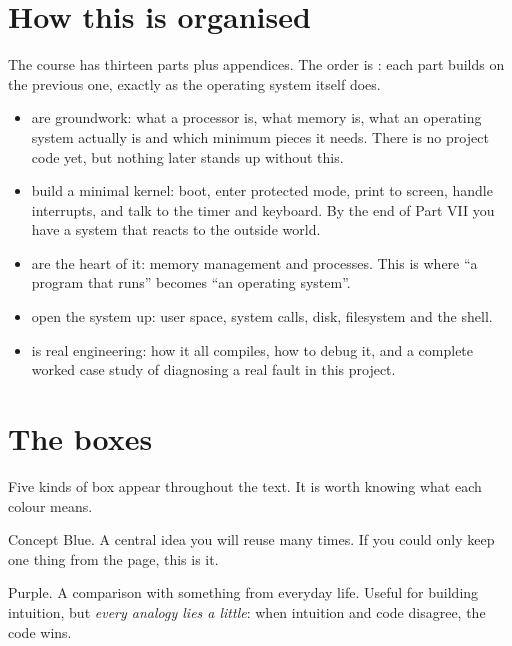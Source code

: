 \section*{How this is organised}

The course has thirteen parts plus appendices. The order is : each part
builds on the previous one, exactly as the operating system itself does.

\begin{itemize}
  \item {} are groundwork: what a processor is, what memory is, what an
        operating system actually is and which minimum pieces it needs. There is no project code
        yet, but nothing later stands up without this.
  \item {} build a minimal kernel: boot, enter protected mode, print to
        screen, handle interrupts, and talk to the timer and keyboard. By the end of Part VII you
        have a system that reacts to the outside world.
  \item {} are the heart of it: memory management and processes. This is
        where ``a program that runs'' becomes ``an operating system''.
  \item {} open the system up: user space, system calls, disk, filesystem
        and the shell.
  \item {} is real engineering: how it all compiles, how to debug it, and a
        complete worked case study of diagnosing a real fault in this project.
\end{itemize}

\section*{The boxes}

Five kinds of box appear throughout the text. It is worth knowing what each colour means.

\begin{concept}{Concept}
Blue. A central idea you will reuse many times. If you could only keep one thing from the page,
this is it.
\end{concept}

\begin{analogy}
Purple. A comparison with something from everyday life. Useful for building intuition, but
\emph{every analogy lies a little}: when intuition and code disagree, the code wins.
\end{analogy}

